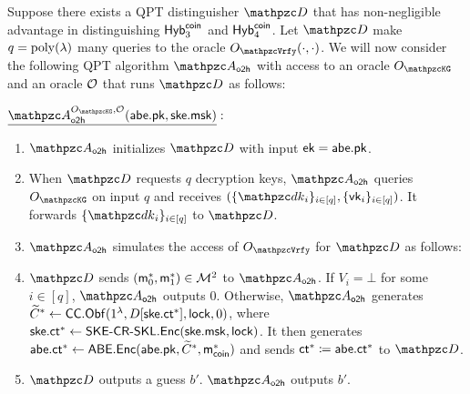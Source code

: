 
Suppose there exists a QPT distinguisher $\qD$ that has
non-negligible advantage in distinguishing $\mathsf{Hyb}_3^{\mathsf{coin}}$ and
$\mathsf{Hyb}_4^{\mathsf{coin}}$. Let $\qD$ make $q = {\mathrm{poly}}(\lambda)$ many queries to
the oracle $\Oracle{\qVrfy}(\cdot, \cdot)$. We will now consider the
following QPT algorithm $\qA_\oh$ with access to an oracle
$\Oracle{\qKG}$ and an oracle $\mathcal{O}$ that runs $\qD$ as follows:

\begin{description}
\item $\underline{\qA_\oh^{\Oracle{\qKG}, \cO}(\abe.\pk, \ske.\msk)}:$
\begin{enumerate}
\item $\qA_\oh$ initializes $\qD$ with input $\mathsf{ek} = \mathsf{abe}.\mathsf{pk}$.
\item When $\qD$ requests $q$ decryption keys, $\qA_\oh$ queries
$\Oracle{\qKG}$ on input $q$ and receives $(\{\qdk_i\}_{i \in [q]}, \{\vk_i\}_{i \in [q]})$. It forwards $\{\qdk_i\}_{i\in [q]}$ to $\qD$.

\item $\qA_\oh$ simulates the access of $\Oracle{\qVrfy}$ for $\qD$ as
follows:

\item $\qD$ sends $(\mathsf{m}_0^*, \mathsf{m}_1^*) \in \mathcal{M}^2$ to $\qA_\oh$. If $V_i =
\bot$ for some $i \in [q]$, $\qA_\oh$ outputs $0$. Otherwise,
$\qA_\oh$ generates $\widetilde{C}^* \leftarrow \mathsf{CC}.\mathsf{Obf}(1^\lambda, D[\mathsf{ske}.\mathsf{ct}^*], \mathsf{lock},
0)$, where $\mathsf{ske}.\mathsf{ct}^* \leftarrow \mathsf{SKE}\textrm{-}\mathsf{CR}\textrm{-}\mathsf{SKL}.\mathsf{Enc}(\mathsf{ske}.\mathsf{msk}, \mathsf{lock})$.
It then generates $\mathsf{abe}.\mathsf{ct}^* \leftarrow\mathsf{ABE}.\mathsf{Enc}(\mathsf{abe}.\mathsf{pk}, \widetilde{C}^*, \mathsf{m}^*_{\mathsf{coin}})$ and sends $\mathsf{ct}^* \coloneqq\mathsf{abe}.\mathsf{ct}^*$ to $\qD$.
\item $\qD$ outputs a guess $b'$. $\qA_\oh$ outputs $b'$.
\end{enumerate}
\end{description}

